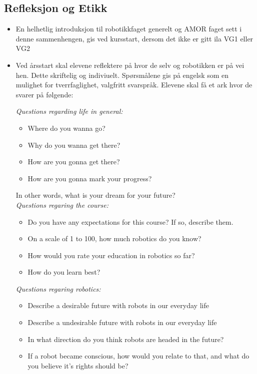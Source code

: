 \subsection{Refleksjon og Etikk}

    \begin{itemize}
        \item En helhetlig introduksjon til robotikkfaget generelt og AMOR faget sett i denne sammenhengen, gis ved kursstart, dersom det ikke er gitt ila VG1 eller VG2
        \item Ved årsstart skal elevene reflektere på hvor de selv og robotikken er på vei hen. Dette skriftelig og indiviuelt. Spørsmålene gis på engelsk som en mulighet for tverrfaglighet, valgfritt svarspråk. Elevene skal få et ark hvor de svarer på følgende:

            \emph{Questions regarding life in general:}
            \begin{itemize}


                \item Where do you wanna go?
                \item Why do you wanna get there?
                \item How are you gonna get there?
                \item How are you gonna mark your progress?

            \end{itemize}
            In other words, what is your dream for your future?\\

            \emph{Questions regaring the course:}
            \begin{itemize}

                \item Do you have any expectations for this course? If so, describe them.
                \item On a scale of 1 to 100, how much robotics do you know?
                \item How would you rate your education in robotics so far?
                \item How do you learn best?

            \end{itemize}

            \emph{Questions regaring robotics:}
            \begin{itemize}

                \item Describe a desirable future with robots in our everyday life
                \item Describe a undesirable future with robots in our everyday life
                \item In what direction do you think robots are headed in the future?
                \item If a robot became conscious, how would you relate to that, and what do you believe it's rights should be?


\end{itemize}
\end{itemize}
